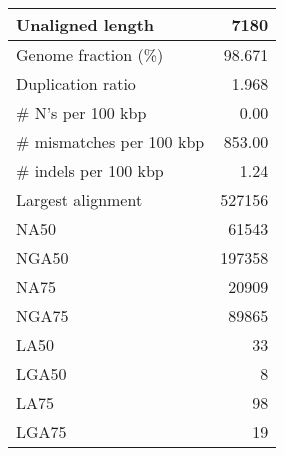 \documentclass[12pt,a4paper]{article}
\begin{document}
\begin{table}[ht]
\begin{center}
\begin{tabular}{|l*{1}{|r}|}
Unaligned length & 7180 \\ \hline
Genome fraction (\%) & 98.671 \\ \hline
Duplication ratio & 1.968 \\ \hline
\# N's per 100 kbp & 0.00 \\ \hline
\# mismatches per 100 kbp & 853.00 \\ \hline
\# indels per 100 kbp & 1.24 \\ \hline
Largest alignment & 527156 \\ \hline
NA50 & 61543 \\ \hline
NGA50 & 197358 \\ \hline
NA75 & 20909 \\ \hline
NGA75 & 89865 \\ \hline
LA50 & 33 \\ \hline
LGA50 & 8 \\ \hline
LA75 & 98 \\ \hline
LGA75 & 19 \\ \hline
\end{tabular}
\end{center}
\end{table}
\end{document}
